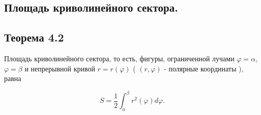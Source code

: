 {
\subsection{Площадь  криволинейного сектора. }
\subsection*{Теорема 4.2}

Площадь криволинейного сектора, то есть, фигуры, ограниченной лучами \( \varphi = \alpha \), \( \varphi = \beta \) и непрерывной кривой \( r = r(\varphi) \) ( \( (r, \varphi) \) - полярные координаты ), равна


\[
S = \frac{1}{2} \int_{\alpha}^{\beta} r^2(\varphi) d\varphi.
\]
}